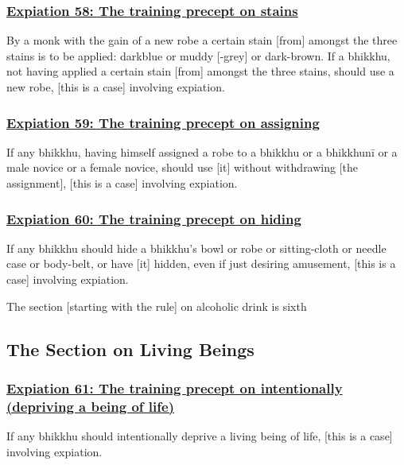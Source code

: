 \subsubsection*{\hyperref[pac58]{Expiation 58: The training precept on stains}}
\label{exp58}
By a monk with the gain of a new robe a certain stain [from] amongst the three stains is to be applied: darkblue or muddy [-grey] or dark-brown. If a bhikkhu, not having applied a certain stain [from] amongst the three stains, should use a new robe, [this is a case] involving expiation.



\subsubsection*{\hyperref[pac59]{Expiation 59: The training precept on assigning}}
\label{exp59}
If any bhikkhu, having himself assigned a robe to a bhikkhu or a bhikkhunī or a male novice or a female novice, should use [it] without withdrawing [the assignment], [this is a case] involving expiation.



\subsubsection*{\hyperref[pac60]{Expiation 60: The training precept on hiding}}
\label{exp60}
If any bhikkhu should hide a bhikkhu's bowl or robe or sitting-cloth or needle case or body-belt, or have [it] hidden, even if just desiring amusement, [this is a case] involving expiation.

\begin{center}
	The section [starting with the rule] on alcoholic drink is sixth
\end{center}



\setsubsecheadstyle{\subsectionFmt}
\subsection{The Section on Living Beings}

\subsubsection*{\hyperref[pac61]{Expiation 61: The training precept on intentionally (depriving a being of life)}}
\label{exp61}
If any bhikkhu should intentionally deprive a living being of life, [this is a case] involving expiation.



